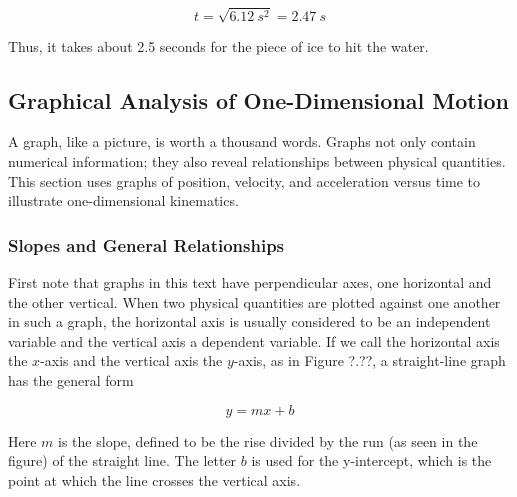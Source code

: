 \documentclass[../../main-ap-physics.tex]{subfiles}
\begin{document}
\begin{equation*}
    t = \sqrt{\SI{6.12}{s^2}} = \SI{2.47}{s}
\end{equation*}

Thus, it takes about 2.5 seconds for the piece of ice to hit the water.

\endsolution


\subsection{Graphical Analysis of One-Dimensional Motion}

A graph, like a picture, is worth a thousand words. Graphs not only contain numerical information; they also reveal relationships between physical quantities. This section uses graphs of position, velocity, and acceleration versus time to illustrate one-dimensional kinematics.

\subsubsection*{Slopes and General Relationships}

First note that graphs in this text have perpendicular axes, one horizontal and the other vertical. When two physical quantities are plotted against one another in such a graph, the horizontal axis is usually considered to be an \gls{independent variable} and the vertical axis a \gls{dependent variable}. If we call the horizontal axis the  $x$-axis and the vertical axis the $y$-axis, as in Figure ?.??, a straight-line graph has the general form

\begin{equation}
    y = mx + b
\end{equation}

Here $m$ is the \gls{slope}, defined to be the rise divided by the run (as seen in the figure) of the straight line. The letter $b$ is used for the \gls{y-intercept}, which is the point at which the line crosses the vertical axis.

\begin{center}
\end{center}
\end{document}

